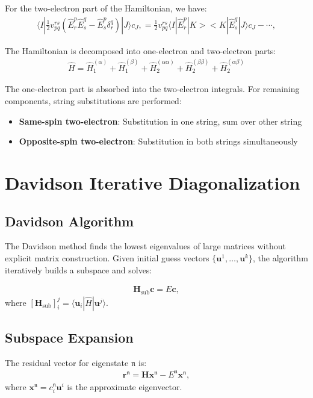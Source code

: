 \documentclass[a4paper,12pt,oneside]{book}
\newcommand{\beq}{\begin{equation}\begin{aligned}}
\newcommand{\eeq}{\end{aligned}\end{equation}}
\newcommand{\half}{\frac{1}{2}}
\newcommand{\op}{\hat}
\newcommand{\mat}{\mathbf}
\newcommand{\vect}{\mathbf}
\newcommand{\st}[1]{\mathfrak{#1}}
\begin{document}
For the two-electron part of the Hamiltonian, we have:
\beq
\langle I| \half v_{pq}^{rs} \left(\op E^{p}_{r} \op E^{q}_{s} - \op E^{p}_{s}\delta^{q}_{r} \right)| J \rangle c_J,
= \half v_{pq}^{rs} \langle I | \op E^{p}_{r} |K><K| \op E^{q}_{s} | J \rangle c_J - \cdots,
\eeq

The Hamiltonian is decomposed into one-electron and two-electron parts:
\beq
\op{H} = \op{H}_1^{(\alpha)} + \op{H}_1^{(\beta)} 
       + \op{H}_2^{(\alpha\alpha)} + \op{H}_2^{(\beta\beta)} + \op{H}_2^{(\alpha\beta)}
\eeq

The one-electron part is absorbed into the two-electron integrals.
For remaining components, string substitutions are performed:
\begin{itemize}
\item \textbf{Same-spin two-electron}: Substitution in one string, sum over other string
\item \textbf{Opposite-spin two-electron}: Substitution in both strings simultaneously
\end{itemize}



\section{Davidson Iterative Diagonalization}
\label{sec:davidson}

\subsection{Davidson Algorithm}

The Davidson method finds the lowest eigenvalues of large matrices 
without explicit matrix construction. Given initial guess vectors $\{\vect{u}^1, \ldots, \vect{u}^k\}$,
the algorithm iteratively builds a subspace and solves:

\beq
\mat{H}_{\text{sub}} \vect{c} = E \vect{c},
\eeq
where $[\mat{H}_{\text{sub}}]_{i}^{j} = \langle \vect{u}_i | \op{H} | \vect{u}^j \rangle$.

\subsection{Subspace Expansion}

The residual vector for eigenstate $\st{n}$ is:
\beq
\vect{r}^{\st{n}} = \mat{H} \vect{x}^{\st{n}} - E^{\st{n}} \vect{x}^{\st{n}},
\eeq
where $\vect{x}^{\st{n}} = c_{i}^{\st{n}} \vect{u}^i$ is the approximate eigenvector.
\end{document}
